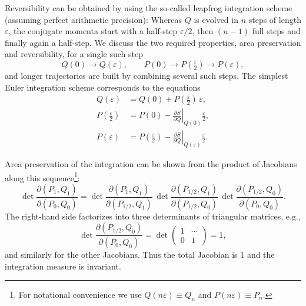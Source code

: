 Reversibility can be obtained by using the so-called leapfrog integration
scheme (assuming perfect arithmetic precision): Whereas $Q$ is evolved in $n$
steps of length $\varepsilon$, the conjugate momenta start with a half-step
$\varepsilon/2$, then $(n-1)$ full steps and finally again a half-step. We
discuss the two required properties, area preservation and reversibility, for a
single such step
\begin{equation}
Q(0) \to Q(\varepsilon), \qquad
P(0) \to P(\tfrac{\varepsilon}{2}) \to P(\varepsilon),
\end{equation}
and longer trajectories are built by combining several such steps. The simplest
Euler integration scheme corresponds to the equations
\begin{equation}
\begin{split}
Q(\varepsilon) &= Q(0) + P(\tfrac{\varepsilon}{2})\,\varepsilon, \\
P(\tfrac{\varepsilon}{2}) &= P(0) - \left.\frac{\partial S}{\partial Q}\right|_{Q(0)}\frac{\varepsilon}{2}, \\
P(\varepsilon) &= P(\tfrac{\varepsilon}{2}) - \left.\frac{\partial S}{\partial Q}\right|_{Q(\varepsilon)}\frac{\varepsilon}{2}.
\end{split}
\end{equation}

Area preservation of the integration can be shown from the product of Jacobians
along this sequence\footnote{For notational convenience we use
$Q(n\varepsilon) \equiv Q_n$ and $P(n\varepsilon) \equiv P_n$.}:
\begin{equation}
\det\frac{\partial(P_1,Q_1)}{\partial(P_0,Q_0)}
= \det\frac{\partial(P_1,Q_1)}{\partial(P_{1/2},Q_1)}\,
  \det\frac{\partial(P_{1/2},Q_1)}{\partial(P_{1/2},Q_0)}\,
  \det\frac{\partial(P_{1/2},Q_0)}{\partial(P_0,Q_0)}.
\end{equation}
The right-hand side factorizes into three determinants of triangular matrices,
e.g.,
\begin{equation}
\det\frac{\partial(P_{1/2},Q_0)}{\partial(P_0,Q_0)}
= \det\begin{pmatrix} 1 & \cdots \\ 0 & 1 \end{pmatrix} = 1,
\end{equation}
and similarly for the other Jacobians. Thus the total Jacobian is 1 and the
integration measure is invariant.

